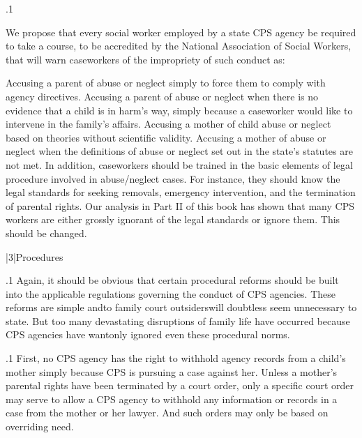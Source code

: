 \documentclass[11pt, twoside]{article}
\begin{document}
{\p.1{%
We propose that every social worker employed by a state CPS agency
be required to take a course, to be accredited by the National Association
of Social Workers, that will warn caseworkers of the impropriety of such
conduct as:

\begin{docEnumerate}

\enumsItem{}  Accusing a parent of abuse or neglect simply to force them
to comply with agency directives.
\enumsItem{} Accusing a parent of abuse or neglect when there is no
evidence that a child is in harm’s way, simply because a
caseworker would like to intervene in the family’s affairs.
\enumsItem{} Accusing a mother of child abuse or neglect based on theories
without scientific validity.
\enumsItem{} Accusing a mother of abuse or neglect when the definitions of
abuse or neglect set out in the state’s statutes are not met.
In addition, caseworkers should be trained in the basic elements
of legal procedure involved in abuse/neglect cases. For instance, they
should know the legal standards for seeking removals, emergency intervention, and the termination of parental rights. Our analysis in
Part II of this book has shown that many CPS workers are either
grossly ignorant of the legal standards or ignore them. This should be
changed.

\end{docEnumerate}

}%


\s|3|{Procedures}

\p.1{%
\noindent{}Again, it should be obvious that certain procedural reforms should be
built into the applicable regulations governing the conduct of CPS agencies. These reforms are simple and\mdash{}to family court outsiders\mdash{}will
doubtless seem unnecessary to state. But too many devastating disruptions of family life have occurred because CPS agencies have wantonly
ignored even these procedural norms.
}%

\p.1{%
First, no CPS agency has the right to withhold agency records from a
child’s mother simply because CPS is pursuing a case against her. Unless
a mother’s parental rights have been terminated by a court order, only
a specific court order may serve to allow a CPS agency to withhold any
information or records in a case from the mother or her lawyer. And
such orders may only be based on overriding need.
}%

}
\end{document}
